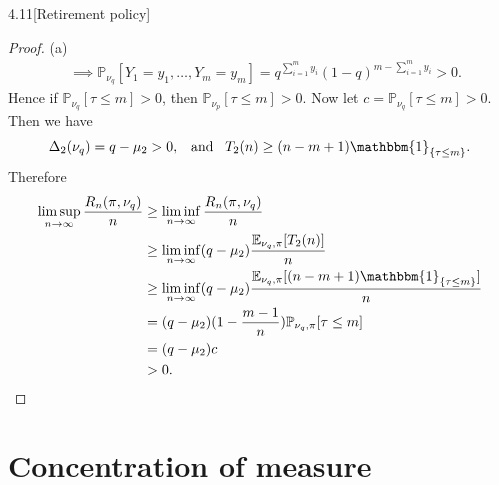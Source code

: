 \documentclass[10pt]{article}
\theoremstyle{definition}
\newenvironment{exercise*}[1]{%
  \IfBlankTF{#1}
    {\renewcommand{\themanualexerciseinner}{\unskip}}
    {\renewcommand\themanualexerciseinner{#1}}%
  \manualexerciseinner
}{\endmanualexerciseinner}
\begin{document}
\begin{exercise*}{4.11}[Retirement policy]
\begin{proof}{(a)}
\begin{align*}
            &\implies \mathbb{P}_{\nu_q}[Y_1 = y_1, \ldots, Y_m = y_m] = q^{\sum_{i=1}^m y_i} (1-q)^{m - \sum_{i=1}^m y_i} > 0.
        \end{align*}
        Hence if $\mathbb{P}_{\nu_q}[\tau \leq m] > 0$, then $\mathbb{P}_{\nu_p}[\tau \leq m] > 0$.
        Now let $c = \mathbb{P}_{\nu_q}[\tau \leq m] > 0$.
        Then we have 
        \begin{equation*}
            \Delta_2 (\nu_q) = q - \mu_2 > 0, \hspace{0.5em} \text{ and } \hspace{0.5em} T_2(n) \geq (n-m+1)\mathbbm{1}_{\{\tau \leq m\}}.
        \end{equation*}
        Therefore
        \begin{align*}
            \limsup_{n \rightarrow \infty} \frac{R_n(\pi, \nu_q)}{n} 
            &\geq \liminf_{n \rightarrow \infty} \frac{R_n(\pi, \nu_q)}{n} \\
            &\geq \liminf_{n \rightarrow \infty} (q-\mu_2)\frac{\mathbb{E}_{\nu_q,\pi}[T_2(n)]}{n} \\
            &\geq \liminf_{n \rightarrow \infty} (q-\mu_2)\frac{\mathbb{E}_{\nu_q,\pi}[(n-m+1)\mathbbm{1}_{\{\tau \leq m\}}]}{n} \\
            &= (q-\mu_2)(1 - \frac{m-1}{n})\mathbb{P}_{\nu_q,\pi}[\tau \leq m] \\
            &= (q-\mu_2)c \\
            &> 0.
        \end{align*}
    \end{proof}
\end{exercise*}

\section{Concentration of measure}
\end{document}
